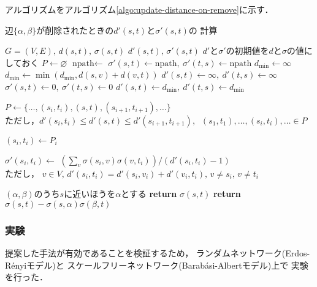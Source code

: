 アルゴリズムをアルゴリズム\ref{algo:update-distance-on-remove}に示す．
\begin{algorithm}[H]
  \caption{辺$\{\alpha,\beta\}$が削除されたときの$d'(s,t)$と$\sigma'(s,t)$の
  計算}\label{algo:update-distance-on-remove}
  \begin{algorithmic}[1]
    \Require $G=(V,E),\,d(s,t),\,\sigma(s,t)$
    \Ensure $d'(s,t),\,\sigma'(s,t)$
    \State $d'$と$\sigma'$の初期値を$d$と$\sigma$の値にしておく
    \State $P\gets\varnothing$
    \State $\textrm{npath}\gets$
    \State $\sigma'(s,t)\gets\textrm{npath},\:\sigma'(t,s)\gets\textrm{npath}$
    \Else{}
    \State $d_{\min}\gets \infty$
    \State $d_{\min}\gets\min\left(d_{\min},d(s,v)+d(v,t)\right)$
    \EndIf
    \EndFor
    \State $d'(s,t)\gets\infty,\:d'(t,s)\gets\infty$
    \State $\sigma'(s,t)\gets 0,\:\sigma'(t,s)\gets 0$
    \Else
    \State $d'(s,t)\gets d_{\min},\:d'(t,s)\gets d_{\min}$
    \State \parbox[t]{\linewidth}{
      $P\gets \{\ldots,(s_i,t_i),(s,t),(s_{i+1},t_{i+1}),\ldots\}$\\
      ただし，$d'(s_i,t_i)\leq d'(s,t)\leq d'(s_{i+1},t_{i+1}),\:$
      $(s_1,t_1),\ldots,(s_i,t_i),\ldots\in P$
    }
    \EndIf
    \EndIf
    \EndFor
    \State $(s_i,t_i)\gets P_i$
    \State \parbox[t]{\linewidth}{
      $\sigma'(s_i,t_i)\gets$
      $\left(\sum_{v}\sigma(s_i,v)\sigma(v,t_i)\right) / (d'(s_i,t_i)-1)$ \\
      ただし，
      $v\in V,\,d'(s_i,t_i)=d'(s_i,v_i)+d'(v_i,t_i),\,v\neq s_i,\,v\neq t_i$
    }
    \EndFor
    \State $(\alpha,\beta)$のうち$s$に近いほうを$\alpha$とする
    \State \textbf{return} $\sigma(s,t)$
    \Else
    \State \textbf{return} $\sigma(s,t)-\sigma(s,\alpha)\sigma(\beta,t)$
    \EndIf
    \EndProcedure
  \end{algorithmic}
\end{algorithm}

\subsubsection*{実験}
提案した手法が有効であることを検証するため，
ランダムネットワーク(Erdos-R{\'e}nyiモデル)と
スケールフリーネットワーク(Barab{\'a}si-Albertモデル)上で
実験を行った．

